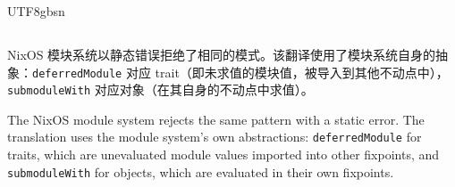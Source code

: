 \begin{CJK*}{UTF8}{gbsn}
\subsection*{}

\ifPaperChinese
\begin{sloppypar}
NixOS 模块系统以静态错误拒绝了相同的模式。该翻译使用了模块系统自身的抽象：\texttt{deferredModule} 对应 trait（即未求值的模块值，被导入到其他不动点中），\texttt{submoduleWith} 对应对象（在其自身的不动点中求值）。
\end{sloppypar}
\else
The NixOS module system rejects the same pattern with a static error.
The translation uses the module system's own abstractions:
\texttt{deferredModule} for traits, which are unevaluated module values imported
into other fixpoints, and \texttt{submoduleWith} for objects, which are evaluated
in their own fixpoints.
\fi


\end{CJK*}
